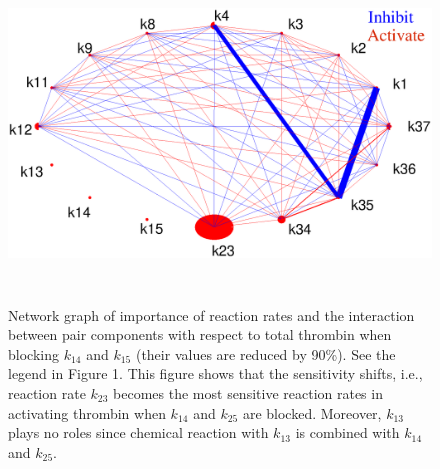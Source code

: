 \begin{figure}
  \begin{center}


   \includegraphics[width=5in,height=3.5in]{figures/NSAD.eps}
\caption{ Network graph of importance of reaction rates and the
interaction between pair components with respect to total thrombin
when blocking $k_{14}$ and $k_{15}$ (their values are reduced by
90\%). See the legend in Figure 1. This figure shows that the
sensitivity shifts, i.e., reaction rate $k_{23}$ becomes the most
sensitive reaction rates in activating thrombin when $k_{14}$ and
$k_{25}$ are blocked. Moreover, $k_{13}$ plays no roles since
chemical reaction with $k_{13}$ is combined with $k_{14}$ and
$k_{25}$. }\label{Fig:NSAD}
  \end{center}
\end{figure}
